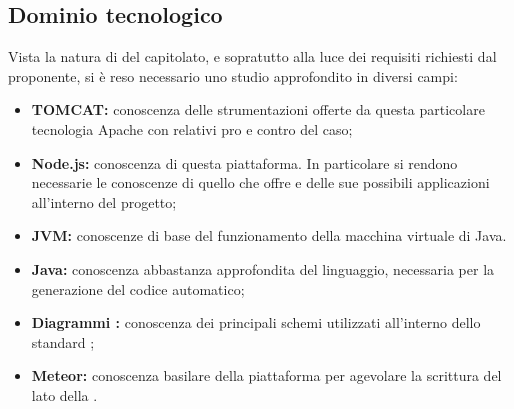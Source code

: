   \subsection{Dominio tecnologico}
    Vista la natura di  del capitolato, e sopratutto alla luce dei requisiti richiesti dal proponente, si è reso necessario uno studio approfondito in diversi campi:
      \begin{itemize}
        \item \textbf{ TOMCAT:}  conoscenza delle strumentazioni offerte da questa particolare tecnologia Apache con relativi pro e contro del caso;
        \item \textbf{Node.js:} conoscenza di questa piattaforma. In particolare si rendono necessarie le conoscenze di quello che offre e delle sue possibili applicazioni
        all'interno del progetto;
        \item \textbf{JVM:} conoscenze di base del funzionamento della macchina virtuale di Java.
        \item \textbf{Java:} conoscenza abbastanza approfondita del linguaggio, necessaria per la generazione del codice automatico;
        \item \textbf{Diagrammi :} conoscenza dei principali schemi utilizzati all'interno dello standard ;
        \item \textbf{Meteor:} conoscenza basilare della piattaforma per agevolare la scrittura del lato  della .
      \end{itemize}
